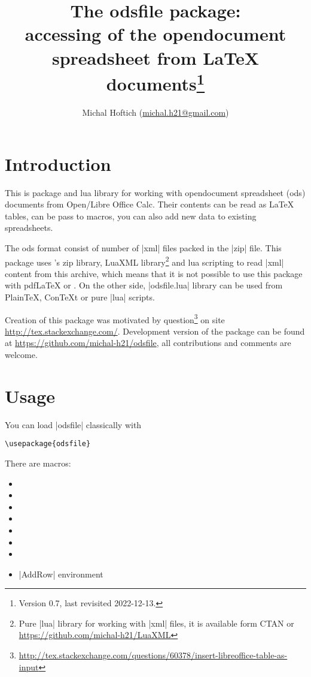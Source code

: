 \documentclass{ltxdoc}
\author{Michal Hoftich (\url{michal.h21@gmail.com})}
\title{The \textsf{odsfile} package:\\
accessing of the \textsf{opendocument spreadsheet} from \LaTeX{}
documents\thanks{Version 0.7, last revisited 2022-12-13.}
}
\newcommand\ods{\textsf{ods}\xspace}
\begin{document}
\maketitle

\tableofcontents

\section{Introduction}

This is \LuaLaTeX{} package and \textsf{lua} library for working with 
\textsf{opendocument spreadsheet} (\ods) documents from Open/Libre Office Calc. 
Their contents can be read as \LaTeX{} tables, can be pass to macros,
 you can also add new data to existing spreadsheets.

The \ods format consist of number of |xml| files packed in the |zip| file. 
This package uses \LuaTeX's zip library, LuaXML library\footnote{Pure |lua| library 
for working with |xml| files, it is available form CTAN or \url{https://github.com/michal-h21/LuaXML}} and lua scripting to read |xml| content from this archive, 
which means that it is not possible to use this package with pdf\LaTeX{} or \XeLaTeX. 
On the other side, |odsfile.lua| library can be used from Plain\TeX, 
Con\TeX{}t or pure |lua| scripts.   

Creation of this package was motivated by question\footnote{\url{http://tex.stackexchange.com/questions/60378/insert-libreoffice-table-as-input}} on site \url{http://tex.stackexchange.com/}. Development version of the package can be found at \url{https://github.com/michal-h21/odsfile}, all contributions and comments are welcome. 
\section{Usage}

You can load |odsfile| classically with
\begin{verbatim}
\usepackage{odsfile}
\end{verbatim}
There are macros:
\begin{itemize}
\item {}
\item {}
\item \cmd{\OdsNl}
\item \cmd{\OdsLastNl}
\item \cmd{\tabletemplate}
\item \cmd{\loadodsfile}
\item \cmd{\savespreadsheet}
\item |AddRow| environment 
\end{itemize}
\end{document}
